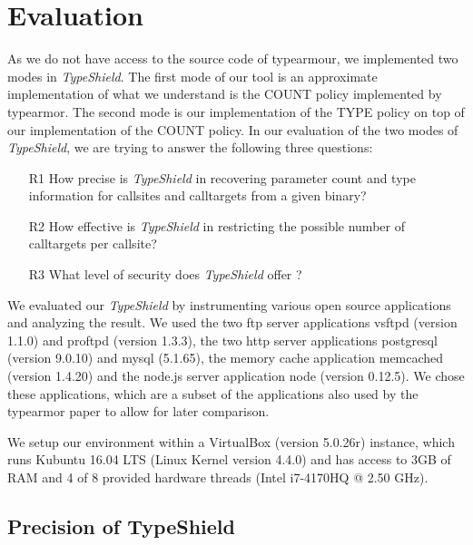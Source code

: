 \chapter{Evaluation}
\label{chapter:Evaluation}
As we do not have access to the source code of typearmour, we implemented two modes in \textit{TypeShield}. The first mode of our tool is an approximate implementation of what we understand is the COUNT policy implemented by typearmor. The second mode is our implementation of the TYPE policy on top of our implementation of the COUNT policy. In our evaluation of the two modes of \textit{TypeShield}, we are trying to answer the following three questions:
\begin{enumerate}

 \item[R1] How precise is \textit{TypeShield} in recovering parameter count and type information for callsites and calltargets from a given binary?

 \item[R2] How effective is \textit{TypeShield} in restricting the possible number of calltargets per callsite?

 \item[R3]  What level of security does \textit{TypeShield} offer ?
%
%

\end{enumerate}
We evaluated our \textit{TypeShield} by instrumenting various open source applications and analyzing the result. We used the two ftp server applications vsftpd (version 1.1.0) and proftpd (version 1.3.3), the two http server applications postgresql (version 9.0.10) and  mysql (5.1.65), the memory cache application memcached (version 1.4.20) and the node.js server application node (version 0.12.5). We chose these applications, which are a subset of the applications also used by the typearmor paper\cite{veen:typearmor} to allow for later comparison.

We setup our environment within a VirtualBox (version 5.0.26r) instance, which runs Kubuntu 16.04 LTS (Linux Kernel version 4.4.0) and has access to 3GB of RAM and 4 of 8 provided hardware threads (Intel i7-4170HQ @ 2.50 GHz).

\section{Precision of TypeShield}
\label{section:typeshieldprecision}

